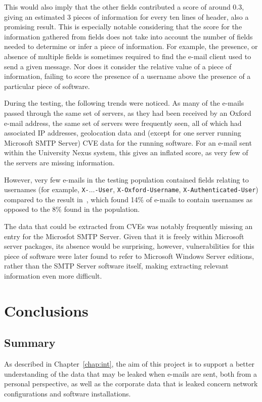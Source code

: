 This would also imply that the other fields contributed a score of around 0.3,
giving an estimated 3 pieces of information for every ten lines of header, also
a promising result. This is especially notable considering that the score for
the information gathered from fields does not take into account the number of
fields needed to determine or infer a piece of information. For example, the
presence, or absence of multiple fields is sometimes required to find the
e-mail client used to send a given message. Nor does it consider the relative
value of a piece of information, failing to score the presence of a username
above the presence of a particular piece of software.

During the testing, the following trends were noticed.  As many of the e-mails
passed through the same set of servers, as they had been received by an Oxford
e-mail address, the same set of servers were frequently seen, all of which had
associated IP addresses, geolocation data and (except for one server running
Microsoft SMTP Server) CVE data for the running software.  For an e-mail sent
within the University Nexus system, this gives an inflated score, as very few
of the servers are missing information.

However, very few e-mails in the testing population contained fields relating
to usernames (for example, \texttt{X-}$\ldots$\texttt{-User}, \texttt{X-Oxford-Username},
\texttt{X-Authenticated-User}) compared to the result
in~\cite{nurse2015investigating}, which found 14\% of e-mails to contain
usernames as opposed to the 8\% found in the population.

The data that could be extracted from CVEs was notably frequently missing an
entry for the Microsfot SMTP Server.  Given that it is freely within Microsoft server
packages, its absence would be surprising, however, vulnerabilities for this
piece of software were later found to refer to Microsoft Windows Server
editions, rather than the SMTP Server software itself, making extracting
relevant information even more difficult.

\cleardoublepage \chapter{Conclusions}\label{chap:conc}
\section{Summary}

As described in Chapter~\ref{chap:int}, the aim of this project is to support a
better understanding of the data that may be leaked when e-mails are sent, both
from a personal perspective, as well as the corporate data that is leaked
concern network configurations and software installations.

